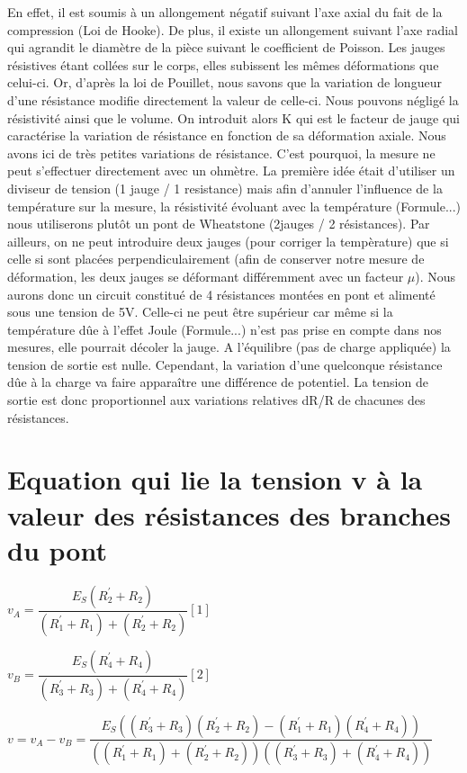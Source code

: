 \documentclass[11pt,a4paper]{report}
\begin{document}
En effet, il est soumis à un allongement négatif suivant l'axe axial du fait de la compression (Loi de Hooke). De plus, il existe un allongement suivant l'axe radial qui agrandit le diamètre de la pièce suivant le coefficient de Poisson. Les jauges résistives étant collées sur le corps, elles subissent les mêmes déformations que celui-ci. Or, d'après la loi de Pouillet, nous savons que la variation de longueur d'une résistance modifie directement la valeur de celle-ci. Nous pouvons négligé la résistivité ainsi que le volume. On introduit alors K qui est le facteur de jauge qui caractérise la variation de résistance en fonction de sa déformation axiale. Nous avons ici de très petites variations de résistance.
C'est pourquoi, la mesure ne peut s'effectuer directement avec un ohmètre. La première idée était d'utiliser un diviseur de tension (1 jauge / 1 resistance) mais afin d'annuler l'influence de la température sur la mesure, la résistivité évoluant avec la température (Formule...)  nous utiliserons plutôt un pont de Wheatstone (2jauges / 2 résistances). Par ailleurs, on ne peut introduire deux jauges (pour corriger la tempèrature) que si celle si sont placées perpendiculairement (afin de conserver notre mesure de déformation, les deux jauges se déformant différemment avec un facteur $\mu$). Nous aurons donc un circuit constitué de 4 résistances montées en pont et alimenté sous une tension de 5V. Celle-ci ne peut être supérieur car même si la température dûe à l'effet Joule (Formule...) n'est pas prise en compte dans nos mesures, elle pourrait décoler la jauge. A l'équilibre (pas de charge appliquée) la tension de sortie est nulle. Cependant, la variation d'une quelconque résistance dûe à la charge va faire apparaître une différence de potentiel. La tension de sortie est donc proportionnel aux variations relatives dR/R de chacunes des résistances. 

\chapter{Equation qui lie la tension v à la valeur des résistances des branches du pont}
$v_{A} = \dfrac{E_{S}(R^{'}_{2}+R_{2})}{(R^{'}_{1}+R_{1})+(R^{'}_{2}+R_{2})} [1]$ 

$v_{B} = \dfrac{E_{S}(R^{'}_{4}+R_{4})}{(R^{'}_{3}+R_{3})+(R^{'}_{4}+R_{4})} [2]$

$v = v_{A} - v_{B} = \dfrac{E_{S}((R^{'}_{3}+R_{3})(R^{'}_{2}+R_{2})-(R^{'}_{1}+R_{1})(R^{'}_{4}+R_{4}))}{((R^{'}_{1}+R_{1})+(R^{'}_{2}+R_{2}))((R^{'}_{3}+R_{3})+(R^{'}_{4}+R_{4}))}$ 
\end{document}
